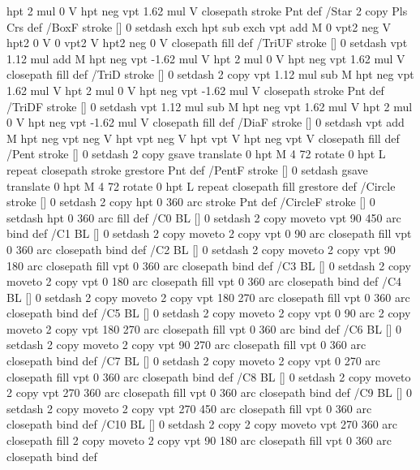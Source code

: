 {{{  hpt 2 mul 0 V
  hpt neg vpt 1.62 mul V closepath stroke
  Pnt  } def
/Star { 2 copy Pls Crs } def
/BoxF { stroke [] 0 setdash exch hpt sub exch vpt add M
  0 vpt2 neg V  hpt2 0 V  0 vpt2 V
  hpt2 neg 0 V  closepath fill } def
/TriUF { stroke [] 0 setdash vpt 1.12 mul add M
  hpt neg vpt -1.62 mul V
  hpt 2 mul 0 V
  hpt neg vpt 1.62 mul V closepath fill } def
/TriD { stroke [] 0 setdash 2 copy vpt 1.12 mul sub M
  hpt neg vpt 1.62 mul V
  hpt 2 mul 0 V
  hpt neg vpt -1.62 mul V closepath stroke
  Pnt  } def
/TriDF { stroke [] 0 setdash vpt 1.12 mul sub M
  hpt neg vpt 1.62 mul V
  hpt 2 mul 0 V
  hpt neg vpt -1.62 mul V closepath fill} def
/DiaF { stroke [] 0 setdash vpt add M
  hpt neg vpt neg V hpt vpt neg V
  hpt vpt V hpt neg vpt V closepath fill } def
/Pent { stroke [] 0 setdash 2 copy gsave
  translate 0 hpt M 4 {72 rotate 0 hpt L} repeat
  closepath stroke grestore Pnt } def
/PentF { stroke [] 0 setdash gsave
  translate 0 hpt M 4 {72 rotate 0 hpt L} repeat
  closepath fill grestore } def
/Circle { stroke [] 0 setdash 2 copy
  hpt 0 360 arc stroke Pnt } def
/CircleF { stroke [] 0 setdash hpt 0 360 arc fill } def
/C0 { BL [] 0 setdash 2 copy moveto vpt 90 450  arc } bind def
/C1 { BL [] 0 setdash 2 copy        moveto
       2 copy  vpt 0 90 arc closepath fill
               vpt 0 360 arc closepath } bind def
/C2 { BL [] 0 setdash 2 copy moveto
       2 copy  vpt 90 180 arc closepath fill
               vpt 0 360 arc closepath } bind def
/C3 { BL [] 0 setdash 2 copy moveto
       2 copy  vpt 0 180 arc closepath fill
               vpt 0 360 arc closepath } bind def
/C4 { BL [] 0 setdash 2 copy moveto
       2 copy  vpt 180 270 arc closepath fill
               vpt 0 360 arc closepath } bind def
/C5 { BL [] 0 setdash 2 copy moveto
       2 copy  vpt 0 90 arc
       2 copy moveto
       2 copy  vpt 180 270 arc closepath fill
               vpt 0 360 arc } bind def
/C6 { BL [] 0 setdash 2 copy moveto
      2 copy  vpt 90 270 arc closepath fill
              vpt 0 360 arc closepath } bind def
/C7 { BL [] 0 setdash 2 copy moveto
      2 copy  vpt 0 270 arc closepath fill
              vpt 0 360 arc closepath } bind def
/C8 { BL [] 0 setdash 2 copy moveto
      2 copy vpt 270 360 arc closepath fill
              vpt 0 360 arc closepath } bind def
/C9 { BL [] 0 setdash 2 copy moveto
      2 copy  vpt 270 450 arc closepath fill
              vpt 0 360 arc closepath } bind def
/C10 { BL [] 0 setdash 2 copy 2 copy moveto vpt 270 360 arc closepath fill
       2 copy moveto
       2 copy vpt 90 180 arc closepath fill
               vpt 0 360 arc closepath } bind def
}}
